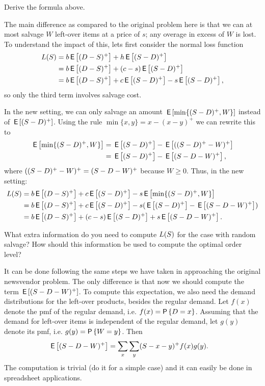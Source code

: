 \begin{exercise}  
Derive the formula above.
\begin{solution}
The main difference as compared to the original problem here is that we can at most salvage $W$ left-over items at a price of $s$; any overage in excess of $W$ is lost. To understand the impact of this, lets first consider the normal loss function
\begin{align*}
   L(S) 
 &= b\,\mathsf{E}\left[(D-S)^+\right] + h \,\mathsf{E}\left[(S-D)^+\right] \\
 &= b\,\mathsf{E}\left[(D-S)^+\right] + (c-s) \,\mathsf{E}\left[(S-D)^+\right] \\
 &= b\,\mathsf{E}\left[(D-S)^+\right] + c\,\mathsf{E}\left[(S-D)^+\right] - s\,\mathsf{E}\left[(S-D)^+\right],
 \end{align*}
so only the third term involves salvage cost. 

In the new setting, we can only salvage an amount $\,\mathsf{E}\left[\min\{(S-D)^+, W\}\right]$ instead of $\,\mathsf{E}\left[(S-D)^+\right]$. Using the rule $\min\{x, y\} = x - (x-y)^+$ we can rewrite this to
\begin{align*}
\,\mathsf{E}\left[\min\{(S-D)^+, W\}\right] 
&=  \,\mathsf{E}\left[(S-D)^+\right] - \,\mathsf{E}\left[((S-D)^+- W)^+\right] \\
&=  \,\mathsf{E}\left[(S-D)^+\right] - \,\mathsf{E}\left[(S-D- W)^+\right],
\end{align*}
where $((S-D)^+-W)^+=(S-D-W)^+$ because $W\geq 0$.  Thus, in the new setting:
\begin{align*}
  L(S) 
 &= b\,\mathsf{E}\left[(D-S)^+\right] + c \,\mathsf{E}\left[(S-D)^+\right] - s\,\mathsf{E}\left[\min\{(S-D)^+, W\}\right] \\
 &= b\,\mathsf{E}\left[(D-S)^+\right] + c \,\mathsf{E}\left[(S-D)^+\right] - s (\,\mathsf{E}\left[(S-D)^+\right] - \,\mathsf{E}\left[(S-D- W)^+\right]) \\
 &= b\,\mathsf{E}\left[(D-S)^+\right] + (c-s) \,\mathsf{E}\left[(S-D)^+\right] + s \,\mathsf{E}\left[(S-D- W)^+\right].
\end{align*}
\end{solution}
\end{exercise}

\begin{exercise}[Continuation]
What extra information do you need to compute $L(S)$ for the case with random salvage? How should this information be used to compute the optimal order level?
\begin{solution}
It can be done following the same steps we have taken in approaching the original newsvendor problem. The only difference is that now we should compute the term $\,\mathsf{E}\left[(S-D-W)^+\right]$. 
To compute this expectation, we also need the demand distributions for the left-over  products, besides the regular demand. Let $f(x)$ denote the pmf of the regular demand, i.e. $f(x)=\P{D=x}$. Assuming that the demand for left-over items is independent of the regular demand, let $g(y)$ denote its pmf, i.e. $g(y)=\P{W=y}$. Then
\begin{align*}
\,\mathsf{E}\left[(S-D-W)^+\right] & = \sum_x \sum_y (S-x-y)^+ f(x) g(y).
\end{align*}
The computation is trivial (do it for a simple case) and it can easily be done in spreadsheet applications.
\end{solution}
\end{exercise}



